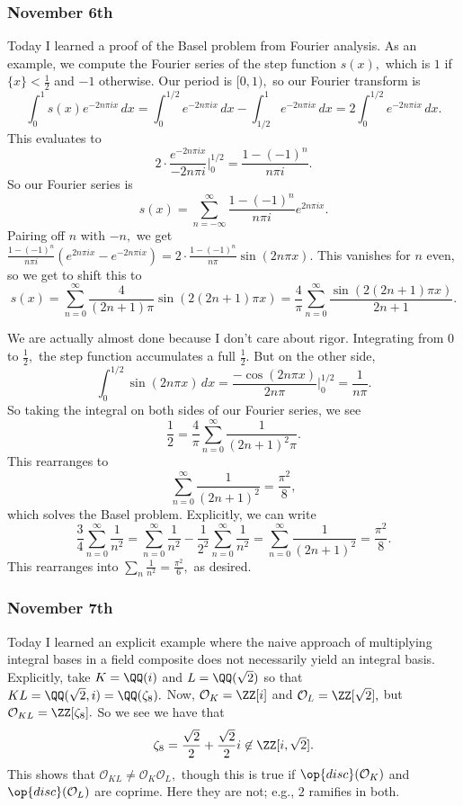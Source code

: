 \subsubsection{November 6th}
Today I learned a proof of the Basel problem from Fourier analysis. As an example, we compute the Fourier series of the step function $s(x),$ which is $1$ if $\{x\}<\frac12$ and $-1$ otherwise. Our period is $[0,1),$ so our Fourier transform is
\[\int_0^1s(x)e^{-2n\pi ix}\,dx=\int_0^{1/2}e^{-2n\pi ix}\,dx-\int_{1/2}^1e^{-2n\pi ix}\,dx=2\int_0^{1/2}e^{-2n\pi ix}\,dx.\]
This evaluates to
\[2\cdot\frac{e^{-2n\pi ix}}{-2n\pi i}\bigg|_0^{1/2}=\frac{1-(-1)^n}{n\pi i}.\]
So our Fourier series is
\[s(x)=\sum_{n=-\infty}^\infty\frac{1-(-1)^n}{n\pi i}e^{2n\pi ix}.\]
Pairing off $n$ with $-n,$ we get $\frac{1-(-1)^n}{n\pi i}\left(e^{2n\pi ix}-e^{-2n\pi ix}\right)=2\cdot\frac{1-(-1)^n}{n\pi}\sin(2n\pi x).$ This vanishes for $n$ even, so we get to shift this to
\[s(x)=\sum_{n=0}^\infty\frac4{(2n+1)\pi}\sin(2(2n+1)\pi x)=\frac4\pi\sum_{n=0}^\infty\frac{\sin(2(2n+1)\pi x)}{2n+1}.\]

We are actually almost done because I don't care about rigor. Integrating from $0$ to $\frac12,$ the step function accumulates a full $\frac12.$ But on the other side,
\[\int_0^{1/2}\sin(2n\pi x)\,dx=\frac{-\cos(2n\pi x)}{2n\pi}\bigg|_0^{1/2}=\frac1{n\pi}.\]
So taking the integral on both sides of our Fourier series, we see
\[\frac12=\frac4\pi\sum_{n=0}^\infty\frac1{(2n+1)^2\pi}.\]
This rearranges to
\[\sum_{n=0}^\infty\frac1{(2n+1)^2}=\frac{\pi^2}8,\]
which solves the Basel problem. Explicitly, we can write
\[\frac34\sum_{n=0}^\infty\frac1{n^2}=\sum_{n=0}^\infty\frac1{n^2}-\frac1{2^2}\sum_{n=0}^\infty\frac1{n^2}=\sum_{n=0}^\infty\frac1{(2n+1)^2}=\frac{\pi^2}8.\]
This rearranges into $\sum_n\frac1{n^2}=\frac{\pi^2}6,$ as desired.

\subsubsection{November 7th}
Today I learned an explicit example where the naive approach of multiplying integral bases in a field composite does not necessarily yield an integral basis. Explicitly, take $K=\QQ(i)$ and $L=\QQ(\sqrt2)$ so that $KL=\QQ(\sqrt2,i)=\QQ(\zeta_8).$ Now, $\mathcal O_K=\ZZ[i]$ and $\mathcal O_L=\ZZ[\sqrt2],$ but $\mathcal O_{KL}=\ZZ[\zeta_8].$ So we see we have that
\[\zeta_8=\frac{\sqrt2}2+\frac{\sqrt2}2i\not\in\ZZ[i,\sqrt2].\]
This shows that $\mathcal O_{KL}\ne\mathcal O_K\mathcal O_L,$ though this is true if $\op{disc}(\mathcal O_K)$ and $\op{disc}(\mathcal O_L)$ are coprime. Here they are not; e.g., $2$ ramifies in both.

